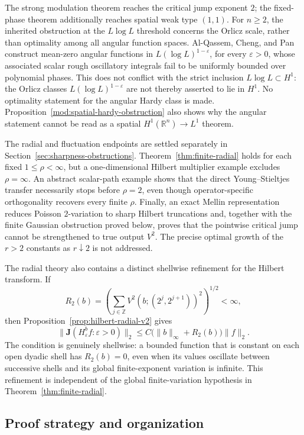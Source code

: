 \documentclass[11pt]{article}
\numberwithin{equation}{section}
\theoremstyle{remark}
\theoremstyle{definition}
\begin{document}
The strong modulation theorem reaches the critical jump exponent $2$;
the fixed-phase theorem additionally reaches spatial weak type $(1,1)$.
For $n\ge2$, the inherited obstruction at the $L\log L$ threshold
concerns the Orlicz scale, rather than optimality among all angular
function spaces.  Al-Qassem, Cheng, and Pan
\cite[Theorem~1.3(b)]{ACP} construct mean-zero angular functions in
$L(\log L)^{1-\varepsilon}$, for every $\varepsilon>0$, whose associated
scalar rough oscillatory integrals fail to be uniformly bounded over
polynomial phases.
This does not conflict with the strict inclusion $L\log L\subset H^1$:
the Orlicz classes $L(\log L)^{1-\varepsilon}$ are not thereby
asserted to lie in $H^1$. No optimality statement for the angular Hardy
class is made. Proposition~\ref{mod:spatial-hardy-obstruction} also
shows why the angular statement cannot be read as a spatial
$H^1(\mathbb R^n)\to L^1$ theorem.

The radial and fluctuation endpoints are settled separately in
Section~\ref{sec:sharpness-obstructions}.  Theorem~\ref{thm:finite-radial}
holds for each fixed $1\le\rho<\infty$, but a one-dimensional Hilbert
multiplier example excludes $\rho=\infty$.  An abstract scalar-path example
shows that the direct Young--Stieltjes transfer necessarily stops before
$\rho=2$, even though operator-specific orthogonality recovers every finite
$\rho$.  Finally, an exact Mellin representation reduces Poisson
$2$-variation to sharp Hilbert truncations and, together with the
finite Gaussian obstruction proved below, proves that the pointwise critical jump cannot
be strengthened to true output $V^2$.  The precise optimal growth of the
$r>2$ constants as $r\downarrow2$ is not addressed.

The radial theory also contains a distinct shellwise refinement for the
Hilbert transform. If
\[
 R_2(b)=\left(\sum_{j\in\mathbb Z}
 V^2(b;(2^j,2^{j+1}))^2\right)^{1/2}<\infty,
\]
then Proposition~\ref{prop:hilbert-radial-v2} gives
\[
 \|\mathbf J(H^b_\varepsilon f:\varepsilon>0)\|_2
 \le C\bigl(\|b\|_\infty+R_2(b)\bigr)\|f\|_2.
\]
The condition is genuinely shellwise: a bounded function that is constant
on each open dyadic shell has $R_2(b)=0$, even when its values oscillate
between successive shells and its global finite-exponent variation is
infinite. This refinement is independent of the global finite-variation
hypothesis in Theorem~\ref{thm:finite-radial}.

\subsection{Proof strategy and organization}\label{intro:strategy}
\end{document}
